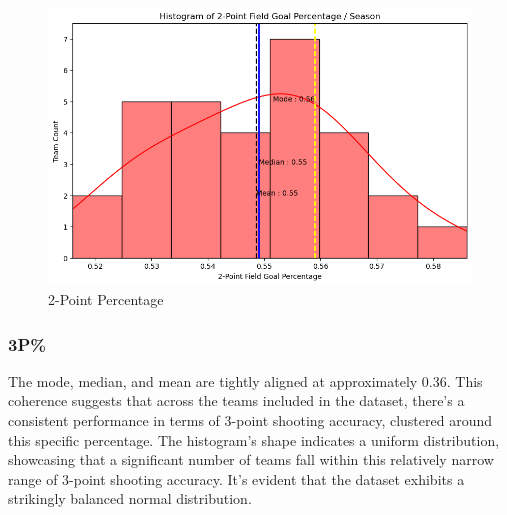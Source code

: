 \documentclass[conference]{IEEEtran}
\begin{document}
\begin{figure}[h]
    \centering
    \includegraphics[scale=0.41]{2P_image.png}
    \caption{2-Point Percentage }
    \label{fig:enter-label}
\end{figure}



\vspace{\baselineskip}
\vspace{\baselineskip}
\vspace{\baselineskip}
\vspace{\baselineskip}
\vspace{\baselineskip}
\vspace{\baselineskip}
\vspace{\baselineskip}
\vspace{\baselineskip}
\vspace{\baselineskip}
\vspace{\baselineskip}

\subsubsection{3P\%}
The mode, median, and mean are tightly aligned at approximately 0.36. This coherence suggests that across the teams included in the dataset, there's a consistent performance in terms of 3-point shooting accuracy, clustered around this specific percentage. The histogram's shape indicates a uniform distribution, showcasing that a significant number of teams fall within this relatively narrow range of 3-point shooting accuracy. It's evident that the dataset exhibits a strikingly balanced normal distribution.
\end{document}
